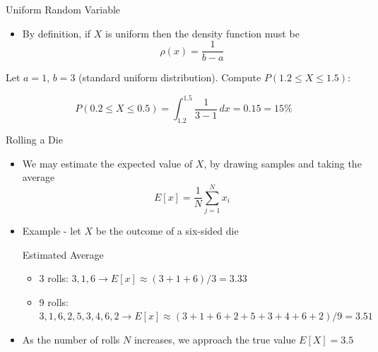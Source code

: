\documentclass[10pt]{beamer}
\begin{document}

\begin{frame}{Uniform Random Variable}

    {}
    \begin{itemize}
        \item By definition, if $X$ is uniform then the density function must be 
            $$\rho(x) = \frac{1}{b-a}$$
    \end{itemize}

    \begin{example}        
    
        Let \(a = 1\), \(b = 3\) (standard uniform distribution). Compute \(P(1.2 \leq X \leq 1.5)\):
    \end{example}
        \[
        P(0.2 \leq X \leq 0.5) = \int_{1.2}^{1.5} \frac{1}{3-1} \, dx = 0.15 = 15\% 
        \]



\end{frame}



\begin{frame}{Rolling a Die}

\begin{itemize}
    \item We may estimate the expected value of $X$, by drawing samples and taking the average
        \begin{equation*}
          E[x] =  \frac{1}{N} \sum_{j=1}^{N} x_i
        \end{equation*}
    \item Example - let $X$ be the outcome of a six-sided die
    
    \begin{block}{Estimated Average}
    \begin{itemize}
        \item 3 rolls: $3,1,6 \rightarrow E[x] \approx (3+1+6)/3 = 3.33$
        \item 9 rolls: $3,1,6,2,5,3,4,6,2 \rightarrow E[x] \approx (3+1+6+2+5+3+4+6+2)/9 = 3.51$
    \end{itemize}
    \end{block}
    
    \item As the number of rolls $N$ increases, we approach the true value $E[X]=3.5$
\end{itemize}
\end{frame}
\end{document}
